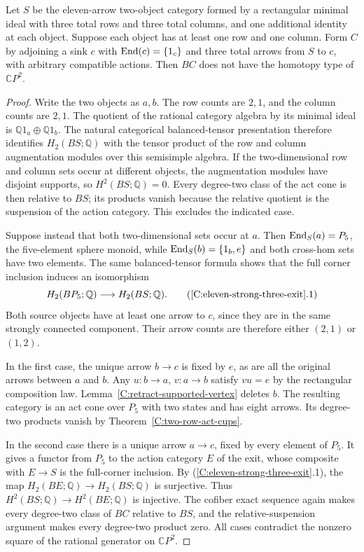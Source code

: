 \begin{proposition}\label{C:eleven-strong-three-exit}
Let $S$ be the eleven-arrow two-object category formed by a
rectangular minimal ideal with three total rows and three total
columns, and one additional identity at each object.  Suppose
each object has at least one row and one column.  Form $C$ by
adjoining a sink $c$ with $\operatorname{End}(c)=\{1_c\}$ and three total
arrows from $S$ to $c$, with arbitrary compatible actions.
Then $BC$ does not have the homotopy type of $\mathbb CP^2$.
\end{proposition}
\begin{proof}
Write the two objects as $a,b$.  The row counts are $2,1$, and
the column counts are $2,1$.  The quotient of the rational
category algebra by its minimal ideal is
$\mathbb Q1_a\oplus\mathbb Q1_b$.  The natural categorical
balanced-tensor presentation therefore identifies $H_2(BS;\mathbb Q)$
with the tensor product of the row and column augmentation modules
over this semisimple algebra.  If the two-dimensional row and
column sets occur at different objects, the augmentation modules
have disjoint supports, so $H^2(BS;\mathbb Q)=0$.
Every degree-two class of the act cone is then relative to $BS$;
its products vanish because the relative quotient is the suspension
of the action category.  This excludes the indicated case.

Suppose instead that both two-dimensional sets occur at $a$.
Then $\operatorname{End}_S(a)=P_5$, the five-element sphere monoid, while
$\operatorname{End}_S(b)=\{1_b,e\}$ and both cross-hom sets have two elements.
The same balanced-tensor formula shows that the full corner
inclusion induces an isomorphism
\[
 H_2(BP_5;\mathbb Q)\longrightarrow H_2(BS;\mathbb Q).
                                                               \tag{\ref{C:eleven-strong-three-exit}.1}
\]
Both source objects have at least one arrow to $c$, since they
are in the same strongly connected component.  Their arrow
counts are therefore either $(2,1)$ or $(1,2)$.

In the first case, the unique arrow $b\to c$ is fixed by $e$,
as are all the original arrows between $a$ and $b$.
Any $u:b\to a$, $v:a\to b$ satisfy $vu=e$ by the rectangular
composition law.  Lemma~\ref{C:retract-supported-vertex} deletes
$b$.  The resulting category is an act cone over $P_5$ with two
states and has eight arrows.  Its degree-two products vanish
by Theorem~\ref{C:two-row-act-cups}.

In the second case there is a unique arrow $a\to c$, fixed by
every element of $P_5$.  It gives a functor from $P_5$ to the
action category $E$ of the exit, whose composite with
$E\to S$ is the full-corner inclusion.  By
(\ref{C:eleven-strong-three-exit}.1), the map
$H_2(BE;\mathbb Q)\to H_2(BS;\mathbb Q)$ is surjective.
Thus $H^2(BS;\mathbb Q)\to H^2(BE;\mathbb Q)$ is injective.
The cofiber exact sequence again makes every degree-two class
of $BC$ relative to $BS$, and the relative-suspension argument
makes every degree-two product zero.  All cases contradict the
nonzero square of the rational generator on $\mathbb CP^2$.
\end{proof}
